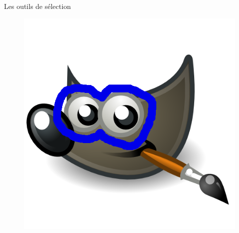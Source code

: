 \begin{frame}{Les outils de sélection}
\begin{overprint}
\begin{enumerate}
{\begin{minipage}{0.45\textwidth}
\begin{figure}
		    		\includegraphics[width=\textwidth]{Images/main_levee.png}
			\end{figure}
			\end{minipage}

	}
\end{enumerate}
\end{overprint}
\end{frame}
